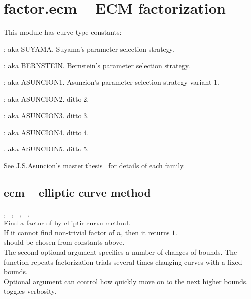

 \section{factor.ecm -- ECM factorization}

 This module has curve type constants:
 \begin{description}
   \item[S]: aka SUYAMA. Suyama's parameter selection strategy.
   \item[B]: aka BERNSTEIN. Bernstein's parameter selection strategy.
   \item[A1]: aka ASUNCION1. Asuncion's parameter selection strategy variant 1.
   \item[A2]: aka ASUNCION2.  ditto 2.
   \item[A3]: aka ASUNCION3.  ditto 3.
   \item[A4]: aka ASUNCION4.  ditto 4.
   \item[A5]: aka ASUNCION5.  ditto 5.
 \end{description}
 See J.S.Asuncion's master thesis~\cite{Janice} for details of each family.

%
  \subsection{ecm -- elliptic curve method}
   {%
     ,\ %
     ,\ %
     ,\ %
     ,\ %
   }{%
   }\\
   \spacing
   \quad Find a factor of  by elliptic curve method.\\
   \spacing
   If it cannot find non-trivial factor of $n$, then it returns $1$.\\ 
   \spacing
   \quad {} should be chosen from  constants above.\\
   \quad The second optional argument  specifies a number
   of changes of bounds. The function repeats factorization
   trials several times changing curves with a fixed bounds.\\
   \quad Optional argument  can control how quickly move
   on to the next higher bounds.\\
   \quad {} toggles verbosity.\\
\C



